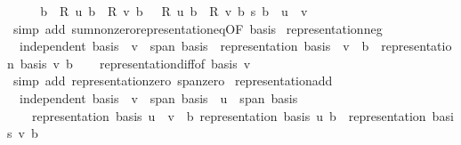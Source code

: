 \begin{isabellebody}
\ \ \isamarkupfalse%
\ \isamarkupfalse%
\ {\isachardoublequoteopen}{\isacharparenleft}{\kern0pt}{\isasymSum}b\ {\isacharbar}{\kern0pt}\ {\isacharquery}{\kern0pt}R\ u\ b\ {\isacharminus}{\kern0pt}\ {\isacharquery}{\kern0pt}R\ v\ b\ {\isasymnoteq}\ {}{\isachardot}{\kern0pt}\ {\isacharparenleft}{\kern0pt}{\isacharquery}{\kern0pt}R\ u\ b\ {\isacharminus}{\kern0pt}\ {\isacharquery}{\kern0pt}R\ v\ b{\isacharparenright}{\kern0pt}\ {\isacharasterisk}{\kern0pt}s\ b{\isacharparenright}{\kern0pt}\ {\isacharequal}{\kern0pt}\ u\ {\isacharminus}{\kern0pt}\ v{\isachardoublequoteclose}\isanewline
\ \ \ \ \isamarkupfalse%
\ {\isacharparenleft}{\kern0pt}simp\ add{\isacharcolon}{\kern0pt}\ sum{\isacharunderscore}{\kern0pt}nonzero{\isacharunderscore}{\kern0pt}representation{\isacharunderscore}{\kern0pt}eq{\isacharbrackleft}{\kern0pt}OF\ basis{\isacharbrackright}{\kern0pt}{\isacharparenright}{\kern0pt}\isanewline
{}\isamarkupfalse%
%
\endisatagproof
{\isafoldproof}%
%
\isadelimproof
\isanewline
%
\endisadelimproof
\isanewline
{}\isamarkupfalse%
\ representation{\isacharunderscore}{\kern0pt}neg{\isacharcolon}{\kern0pt}\isanewline
\ \ {\isachardoublequoteopen}independent\ basis\ {\isasymLongrightarrow}\ v\ {\isasymin}\ span\ basis\ {\isasymLongrightarrow}\ representation\ basis\ {\isacharparenleft}{\kern0pt}{\isacharminus}{\kern0pt}\ v{\isacharparenright}{\kern0pt}\ {\isacharequal}{\kern0pt}\ {\isacharparenleft}{\kern0pt}{\isasymlambda}b{\isachardot}{\kern0pt}\ {\isacharminus}{\kern0pt}\ representation\ basis\ v\ b{\isacharparenright}{\kern0pt}{\isachardoublequoteclose}\isanewline
%
\isadelimproof
\ \ %
\endisadelimproof
%
\isatagproof
{}\isamarkupfalse%
\ representation{\isacharunderscore}{\kern0pt}diff{\isacharbrackleft}{\kern0pt}of\ basis\ v\ {}{\isacharbrackright}{\kern0pt}\ \isamarkupfalse%
\ {\isacharparenleft}{\kern0pt}simp\ add{\isacharcolon}{\kern0pt}\ representation{\isacharunderscore}{\kern0pt}zero\ span{\isacharunderscore}{\kern0pt}zero{\isacharparenright}{\kern0pt}%
\endisatagproof
{\isafoldproof}%
%
\isadelimproof
\isanewline
%
\endisadelimproof
\isanewline
{}\isamarkupfalse%
\ representation{\isacharunderscore}{\kern0pt}add{\isacharcolon}{\kern0pt}\isanewline
\ \ {\isachardoublequoteopen}independent\ basis\ {\isasymLongrightarrow}\ v\ {\isasymin}\ span\ basis\ {\isasymLongrightarrow}\ u\ {\isasymin}\ span\ basis\ {\isasymLongrightarrow}\isanewline
\ \ \ \ representation\ basis\ {\isacharparenleft}{\kern0pt}u\ {\isacharplus}{\kern0pt}\ v{\isacharparenright}{\kern0pt}\ {\isacharequal}{\kern0pt}\ {\isacharparenleft}{\kern0pt}{\isasymlambda}b{\isachardot}{\kern0pt}\ representation\ basis\ u\ b\ {\isacharplus}{\kern0pt}\ representation\ basis\ v\ b{\isacharparenright}{\kern0pt}{\isachardoublequoteclose}\isanewline

\end{isabellebody}
